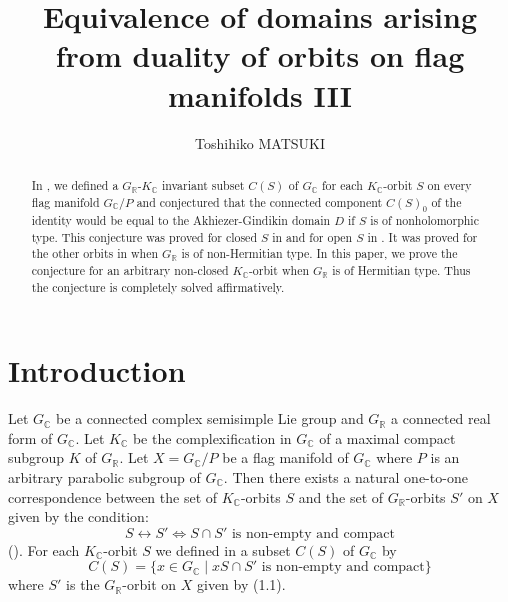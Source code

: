 \documentclass[12pt,a4paper]{amsart}
\theoremstyle{definition}
\theoremstyle{remark}
\numberwithin{equation}{section}
\def\br{\mathbb R}
\def\bc{\mathbb C}
\begin{document}
\title[Equivalence of domains III]{Equivalence of domains arising from duality of orbits on flag manifolds III}

\author{Toshihiko MATSUKI}
\address{Department of Mathematics\\
        Faculty of Science\\
        Kyoto University\\
        Kyoto 606-8502, Japan}
\date{}


\begin{abstract}
In \cite{GM1}, we defined a $G_\br$-$K_\bc$ invariant subset $C(S)$ of $G_\bc$ for each $K_\bc$-orbit $S$ on every flag manifold $G_\bc/P$ and conjectured that the connected component $C(S)_0$ of the identity would be equal to the Akhiezer-Gindikin domain $D$ if $S$ is of nonholomorphic type. This conjecture was proved for closed $S$ in \cite{WZ1,WZ2,FH,M8} and for open $S$ in \cite{M8}. It was proved for the other orbits in \cite{M9} when $G_\br$ is of non-Hermitian type. In this paper, we prove the conjecture for an arbitrary non-closed $K_\bc$-orbit when $G_\br$ is of Hermitian type. Thus the conjecture is completely solved affirmatively.
\end{abstract}

\maketitle

\section{Introduction}

Let $G_\bc$ be a connected complex semisimple Lie group and $G_\br$ a connected real form of $G_\bc$. Let $K_\bc$ be the complexification in $G_\bc$ of a maximal compact subgroup $K$ of $G_\br$. Let $X=G_\bc/P$ be a flag manifold of $G_\bc$ where $P$ is an arbitrary parabolic subgroup of $G_\bc$. Then there exists a natural one-to-one correspondence between the set of $K_\bc$-orbits $S$ and the set of $G_\br$-orbits $S'$ on $X$ given by the condition:
\begin{equation}
S\leftrightarrow S'\Longleftrightarrow S\cap S'\mbox{ is non-empty and compact} \tag{1.1}
\end{equation}
(\cite{M4}). For each $K_\bc$-orbit $S$ we defined in \cite{GM1} a subset $C(S)$ of $G_\bc$ by
$$C(S)=\{x\in G_\bc\mid xS\cap S'\mbox{ is non-empty and compact}\}$$
where $S'$ is the $G_\br$-orbit on $X$ given by (1.1).
\end{document}
